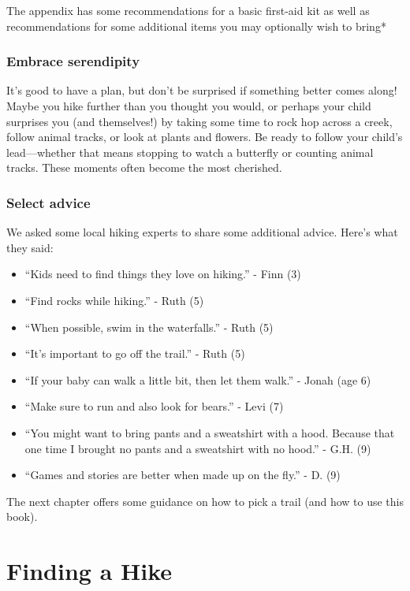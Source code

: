 \documentclass[
  letterpaper,
  DIV=11,
  numbers=noendperiod]{scrreprt}
\providecommand{\tightlist}{%
  \setlength{\itemsep}{0pt}\setlength{\parskip}{0pt}}\usepackage{longtable,booktabs,array}
\begin{document}
The appendix has some recommendations for a basic first-aid kit as well
as recommendations for some additional items you may optionally wish to
bring*

\subsection{Embrace serendipity}\label{embrace-serendipity}

It's good to have a plan, but don't be surprised if something better
comes along! Maybe you hike further than you thought you would, or
perhaps your child surprises you (and themselves!) by taking some time
to rock hop across a creek, follow animal tracks, or look at plants and
flowers. Be ready to follow your child's lead---whether that means
stopping to watch a butterfly or counting animal tracks. These moments
often become the most cherished.

\subsection{Select advice}\label{select-advice}

We asked some local hiking experts to share some additional advice.
Here's what they said:

\begin{itemize}
\tightlist
\item
  ``Kids need to find things they love on hiking.'' - Finn (3)
\item
  ``Find rocks while hiking.'' - Ruth (5)
\item
  ``When possible, swim in the waterfalls.'' - Ruth (5)
\item
  ``It's important to go off the trail.'' - Ruth (5)
\item
  ``If your baby can walk a little bit, then let them walk.'' - Jonah
  (age 6)
\item
  ``Make sure to run and also look for bears.'' - Levi (7)
\item
  ``You might want to bring pants and a sweatshirt with a hood. Because
  that one time I brought no pants and a sweatshirt with no hood.'' -
  G.H. (9)
\item
  ``Games and stories are better when made up on the fly.'' - D. (9)
\end{itemize}

The next chapter offers some guidance on how to pick a trail (and how to
use this book).

\chapter{Finding a Hike}\label{finding-a-hike}
\end{document}
